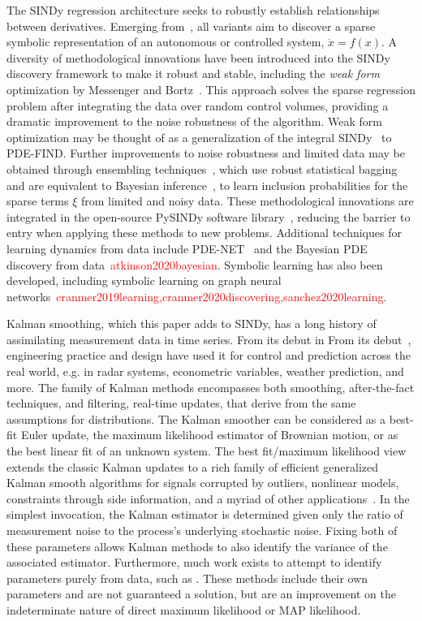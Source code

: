 \documentclass{article}
\newcommand{\red}[1]{\textcolor{red}{#1}}
\begin{document}
The SINDy regression architecture seeks to robustly establish relationships between derivatives.
Emerging from~\cite{Brunton2016,brunton2022data}, all variants aim to discover a sparse symbolic representation of an autonomous or controlled system, $\dot x = f(x)$.
A diversity of methodological innovations have been introduced into the SINDy discovery framework to make it robust and stable, including the \emph{weak form} optimization by Messenger and Bortz~\cite{messenger2021bweak,messenger2021weak}.
This approach solves the sparse regression problem after integrating the data over random control volumes, providing a dramatic improvement to the noise robustness of the algorithm.
Weak form optimization may be thought of as a generalization of the integral SINDy~\cite{Schaeffer2017} to PDE-FIND.
Further improvements to noise robustness and limited data may be obtained through ensembling techniques~\cite{Fasel2022}, which use robust statistical bagging and are equivalent to Bayesian inference~\cite{gao2022bayesian,gao2023convergence}, to learn inclusion probabilities for the sparse terms $\xi$ from limited and noisy data.
These methodological innovations are integrated in the open-source PySINDy software library~\cite{Kaptanoglu2022}, reducing the barrier to entry when applying these methods to new problems.  Additional techniques for learning dynamics from data include PDE-NET~\cite{Long2019,Long2018} and the Bayesian PDE discovery from data~\red{atkinson2020bayesian}.
Symbolic learning has also been developed, including symbolic learning on graph neural networks~\red{cranmer2019learning,cranmer2020discovering,sanchez2020learning}.

Kalman smoothing, which this paper adds to SINDy, has a long history of assimilating measurement data in time series.
From its debut in From its debut~\cite{kalman, KalBuc}, engineering practice and design have used it for control and prediction across the real world, e.g. in radar systems, econometric variables, weather prediction, and more.
The family of Kalman methods encompasses both smoothing, after-the-fact techniques, and filtering, real-time updates, that derive from the same assumptions for distributions.
The Kalman smoother can be considered as a best-fit Euler update, the maximum likelihood estimator of Brownian motion, or as the best linear fit of an unknown system.
The best fit/maximum likelihood view extends the classic Kalman updates to a rich family of efficient generalized Kalman smooth algorithms for signals corrupted by outliers, nonlinear models, constraints through side information, and a myriad of other applications~\cite{aravkin2017generalized}.
In the simplest invocation, the Kalman estimator is determined given only the ratio of measurement noise to the process's underlying stochastic noise.
Fixing both of these parameters allows Kalman methods to also identify the variance of the associated estimator.
Furthermore, much work exists to attempt to identify parameters purely from data, such as \cite{Barratt2020,VanBreugel2020}.
These methods include their own parameters and are not guaranteed a solution, but are an improvement on the indeterminate nature of direct maximum likelihood or MAP likelihood.
\end{document}
